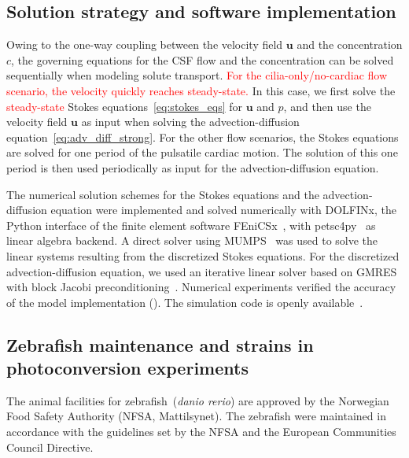 \documentclass[fleqn]{wlscirep}
\newcommand{\uu}{\mathbf{u}}
\newcommand{\fixme}[1]{\textcolor{red}{#1}}
\begin{document}
\subsection*{Solution strategy and software implementation}
Owing to the one-way coupling between the velocity field $\uu$
and the concentration $c$, the governing equations for the
CSF flow and the concentration can be solved sequentially when modeling solute transport.
\fixme{For the cilia-only/no-cardiac flow scenario, the velocity quickly reaches steady-state.}
In this case, we first solve the \fixme{steady-state} Stokes equations~\eqref{eq:stokes_eqs}
for $\uu$ and $p$, and then use the velocity field $\uu$ as input when solving
the advection-diffusion equation~\eqref{eq:adv_diff_strong}.
For the other flow scenarios, the Stokes equations are solved for one
period of the pulsatile cardiac motion. The solution of this one period
is then used periodically as input for the advection-diffusion equation.

The numerical solution schemes for the Stokes equations and the
advection-diffusion equation were implemented and solved numerically with DOLFINx,
the Python interface of the finite element software
FEniCSx~\cite{TheFEniCSProject2024FEniCSxDocumentation}, with
petsc4py~\cite{Dalcin2011ParallelPython} as linear algebra backend.
A direct solver using MUMPS~\cite{Amestoy2011Mumps} was used to solve the
linear systems resulting from the discretized Stokes equations.
For the discretized advection-diffusion equation, we used an iterative
linear solver based on GMRES~\cite{Saad1986GMRES:Systems} with block Jacobi
preconditioning~\cite{Jacobi1845UeberGleichungen}.
Numerical experiments verified the accuracy of the model implementation
(). The simulation code is openly
available~\cite{zenodo-link-to-all-code}. 

\subsection*{Zebrafish maintenance and strains in photoconversion experiments}
The animal facilities for zebrafish~(\emph{danio rerio}) are approved by the
Norwegian Food Safety Authority (NFSA, Mattilsynet).
The zebrafish were maintained in accordance with the guidelines set by the
NFSA and the European Communities Council Directive.
\end{document}
